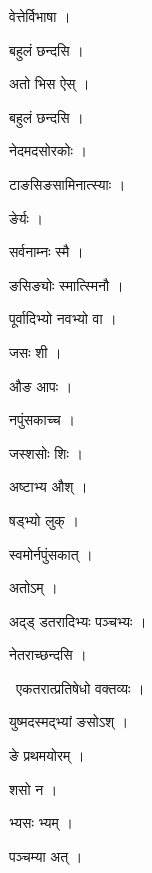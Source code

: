 \documentclass[10pt, openany, oneside]{book}
\begin{document}
\noindent वेत्तेर्विभाषा ।

\noindent बहुलं छन्दसि ।

\noindent अतो भिस ऐस् ।

\noindent बहुलं छन्दसि ।

\noindent नेदमदसोरकोः ।

\noindent टाङसिङसामिनात्स्याः ।

\noindent ङेर्यः ।

\noindent सर्वनाम्नः स्मै ।

\noindent ङसिङ्योः स्मात्स्मिनौ ।

\noindent पूर्वादिभ्यो नवभ्यो वा ।

\noindent जसः शी ।

\noindent औङ आपः ।

\noindent नपुंसकाच्च ।

\noindent जस्शसोः शिः ।

\noindent अष्टाभ्य औश् ।

\noindent षड्भ्यो लुक् ।

\noindent स्वमोर्नपुंसकात् ।

\noindent अतोऽम् ।

\noindent अद्ड् डतरादिभ्यः पञ्चभ्यः ।

\noindent नेतराच्छन्दसि ।

\par\noindent\hspace{1.5em}{\vps वा॰}~{\qt एकतरात्प्रतिषेधो वक्तव्यः ।}

\noindent युष्मदस्मद्भ्यां ङसोऽश् ।

\noindent ङे प्रथमयोरम् ।

\noindent शसो न ।

\noindent भ्यसः भ्यम् ।

\noindent पञ्चम्या अत् ।
\end{document}
